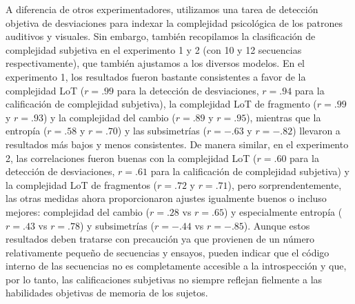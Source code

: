 
A diferencia de otros experimentadores, utilizamos una tarea de detección objetiva de desviaciones para indexar la complejidad psicológica de los patrones auditivos y visuales. Sin embargo, también recopilamos la clasificación de complejidad subjetiva en el experimento 1 y 2 (con 10 y 12 secuencias respectivamente), que también ajustamos a los diversos modelos. En el experimento 1, los resultados fueron bastante consistentes a favor de la complejidad LoT ($r = .99$ para la detección de desviaciones, $r = .94$ para la calificación de complejidad subjetiva), la complejidad LoT de fragmento ($r = .99$ y $r = .93$) y la complejidad del cambio ($r = .89$ y $r = .95$), mientras que la entropía ($r = .58$ y $r = .70$) y las subsimetrías ($r = -.63$ y $r = -.82$) llevaron a resultados más bajos y menos consistentes. De manera similar, en el experimento 2, las correlaciones fueron buenas con la complejidad LoT ($r = .60$ para la detección de desviaciones, $r = .61$ para la calificación de complejidad subjetiva) y la complejidad LoT de fragmentos ($r = .72$ y $r = .71$), pero sorprendentemente, las otras medidas ahora proporcionaron ajustes igualmente buenos o incluso mejores: complejidad del cambio ($r = .28$ vs $r = .65$) y especialmente entropía ($r = .43$ vs $r = .78$) y subsimetrías ($r = -. 44$ vs $r = -. 85$). Aunque estos resultados deben tratarse con precaución ya que provienen de un número relativamente pequeño de secuencias y ensayos, pueden indicar que el código interno de las secuencias no es completamente accesible a la introspección y que, por lo tanto, las calificaciones subjetivas no siempre reflejan fielmente a las habilidades objetivas de memoria de los sujetos.

